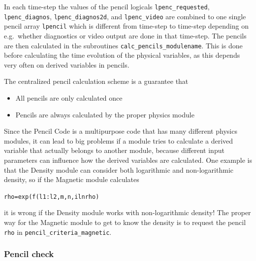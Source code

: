 \documentclass[\mydriver,12pt,twoside,notitlepage,a4paper]{article}
\newcommand{\code}[1]{\texttt{#1}}
\begin{document}
In each time-step the values of the pencil logicals \code{lpenc_requested},
\code{lpenc_diagnos}, \code{lpenc_diagnos2d}, and \code{lpenc_video} are
combined to one single pencil array \code{lpencil} which is different from
time-step to time-step depending on e.g.\ whether diagnostics or video output
are done in that time-step.  The pencils are then calculated in the subroutines
\code{calc_pencils_modulename}. This is done before calculating the time
evolution of the physical variables, as this depends very often on derived
variables in pencils.

The centralized pencil calculation scheme is a guarantee that
\begin{itemize}
  \item All pencils are only calculated once
  \item Pencils are always calculated by the proper physics module
\end{itemize}
Since the {\sc Pencil Code} is a multipurpose code that has many different physics
modules, it can lead to big problems if a module tries to calculate a derived
variable that actually belongs to another module, because different input
parameters can influence how the derived variables are calculated. One example
is that the Density module can consider both logarithmic and non-logarithmic
density, so if the Magnetic module calculates
\begin{alltt}
  rho = exp(f(l1:l2,m,n,ilnrho)
\end{alltt}
it is wrong if the Density module works with non-logarithmic density! The
proper way for the Magnetic module to get to know the density is to request the
pencil \code{rho} in \code{pencil_criteria_magnetic}.

\subsubsection{Pencil check}
\end{document}
